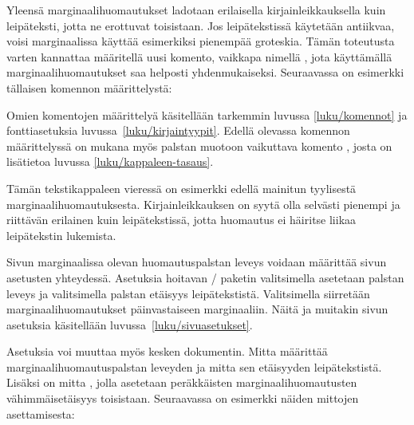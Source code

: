\noindent
Yleensä marginaalihuomautukset ladotaan erilaisella kirjainleikkauksella
kuin leipäteksti, jotta ne erottuvat toisistaan. Jos leipätekstissä
käytetään antiikvaa, voisi marginaalissa käyttää esimerkiksi pienempää
groteskia. Tämän toteutusta varten kannattaa määritellä uusi komento,
vaikkapa nimellä , jota käyttämällä
marginaalihuomautukset saa helposti yhdenmukaiseksi. Seuraavassa on
esimerkki tällaisen komennon määrittelystä:

\begin{koodilohkosis}
\newcommand{\huomautus}[1]{%
  \marginpar{\sffamily\scriptsize\RaggedRight #1}}
\end{koodilohkosis}

\noindent
Omien komentojen määrittelyä käsitellään tarkemmin luvussa
\ref{luku/komennot} ja fonttiasetuksia luvussa~\ref{luku/kirjaintyypit}.
Edellä olevassa komennon määrittelyssä on mukana myös palstan muotoon
vaikuttava komento , josta on lisätietoa luvussa
\ref{luku/kappaleen-tasaus}.

Tämän  tekstikappaleen vieressä
on esimerkki edellä mainitun tyylisestä marginaalihuomautuksesta.
Kirjainleikkauksen on syytä olla selvästi pienempi ja riittävän
erilainen kuin leipätekstissä, jotta huomautus ei häiritse liikaa
leipätekstin lukemista. \noclub[3]

Sivun marginaalissa olevan huomautuspalstan leveys voidaan määrittää
sivun asetusten yhteydessä. Asetuksia hoitavan \-/
paketin valitsimella  asetetaan palstan leveys ja
valitsimella  palstan etäisyys leipätekstistä.
Valitsimella  siirretään marginaalihuomautukset
päinvastaiseen marginaaliin. Näitä ja muitakin sivun asetuksia
käsitellään luvussa~\ref{luku/sivuasetukset}.

Asetuksia voi muuttaa myös kesken dokumentin. Mitta
 määrittää marginaalihuomautuspalstan leveyden ja
mitta  sen etäisyyden leipätekstistä. Lisäksi on
mitta , jolla asetetaan peräkkäisten
marginaalihuomautusten vähimmäisetäisyys toisistaan. Seuraavassa on
esimerkki näiden mittojen asettamisesta:

\begin{koodilohkosis}
\setlength{\marginparwidth}{50bp}
\setlength{\marginparsep}{10bp}
\setlength{\marginparpush}{6bp}
\end{koodilohkosis}

